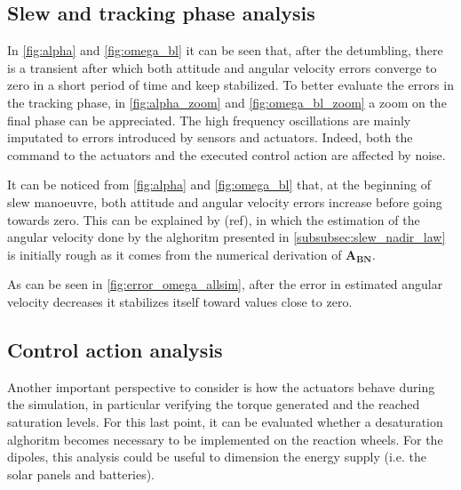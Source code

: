 \subsection{Slew and tracking phase analysis}
\label{subsec:slew_analysis}



In \autoref{fig:alpha} and \autoref{fig:omega_bl} it can be seen that, after the detumbling, there is a transient after which both attitude and angular velocity errors converge to zero in a short period of time and keep stabilized.
To better evaluate the errors in the tracking phase, in \autoref{fig:alpha_zoom} and \autoref{fig:omega_bl_zoom} a zoom on the final phase can be appreciated. The high frequency oscillations are mainly imputated to errors introduced by sensors and actuators. Indeed, both the command to the actuators and the executed control action are affected by noise.

It can be noticed from \autoref{fig:alpha} and \autoref{fig:omega_bl} that, at the beginning of slew manoeuvre, both attitude and angular velocity errors increase before going towards zero. This can be explained by (ref), in which the estimation of the angular velocity done by the alghoritm presented in \autoref{subsubsec:slew_nadir_law} is initially rough as it comes from the numerical derivation of $\boldsymbol{A_{BN}}$.


As can be seen in \autoref{fig:error_omega_allsim}, after the error in estimated angular velocity decreases it stabilizes itself toward values close to zero.

\subsection{Control action analysis}
\label{subsec:control_analysis}

Another important perspective to consider is how the actuators behave during the simulation, in particular verifying the torque generated and the reached saturation levels. For this last point, it can be evaluated whether a desaturation alghoritm becomes necessary to be implemented on the reaction wheels. For the dipoles, this analysis could be useful to dimension the energy supply (i.e. the solar panels and batteries).

